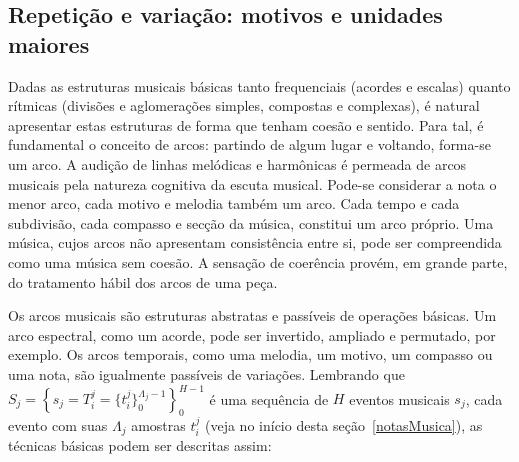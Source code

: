 \subsection{Repetição e variação: motivos e unidades maiores}\label{subsec:motivos}
Dadas as estruturas musicais básicas tanto frequenciais (acordes e escalas) quanto 
rítmicas (divisões e aglomerações simples, compostas e complexas), é 
natural apresentar estas estruturas de forma que tenham coesão e sentido.\cite{Boulez}
Para tal, é fundamental o conceito de arcos: partindo de algum lugar e voltando, forma-se um arco. 
A audição de linhas melódicas e harmônicas é permeada de arcos musicais pela natureza cognitiva
da escuta musical. Pode-se considerar a nota o menor arco, cada motivo e melodia também um arco.
Cada tempo e cada subdivisão, cada compasso e secção da música, constitui um arco próprio.
Uma música, cujos arcos não apresentam consistência entre si, pode ser compreendida como uma música sem coesão.
A sensação de coerência provém, em grande parte, do tratamento hábil dos arcos de uma peça.

Os arcos musicais são estruturas abstratas e passíveis de operações básicas. Um arco espectral, como um
acorde, pode ser invertido, ampliado e permutado, por exemplo. Os arcos temporais, como uma melodia, um motivo, um compasso ou
uma nota, são igualmente passíveis de variações. Lembrando que $S_j=\left\{s_j=T_i^j=\{t_i^{j}\}_0^{\Lambda_j-1}\right\}_0^{H-1}$ é uma
sequência de $H$ eventos musicais $s_j$, cada evento com suas $\Lambda_j$ amostras $t_i^j$ (veja no início desta seção~\ref{notasMusica}), as técnicas básicas podem ser descritas assim:

